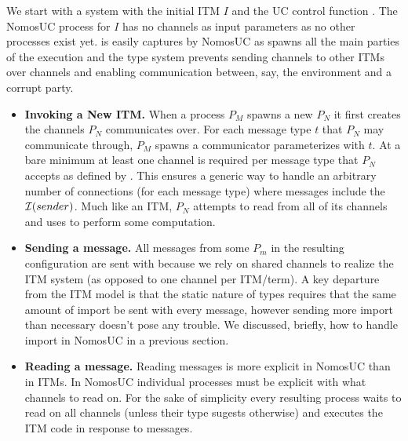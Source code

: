 We start with a system with the initial ITM $I$ and the UC control function \cf.
The NomosUC process for $I$ has no channels as input parameters as no other processes exist yet.
\cf is easily captures by NomosUC as  spawns all the main parties of the execution and the type system prevents sending channels to other ITMs over channels and enabling communication between, say, the environment and a corrupt party.

\begin{itemize}
	\item {\bf Invoking a New ITM.} 
		When a process $P_M$ spawns a new $P_N$ it first creates the channels $P_N$ communicates over. 
		For each message type $t$ that $P_N$ may communicate through, $P_M$ spawns a communicator parameterizes with $t$.
		At a bare minimum at least one channel is required per message type that $P_N$ accepts as defined by \cf. 
		This ensures a generic way to handle an arbitrary number of connections (for each message type) where messages include the $\mathcal{I}(sender)$.
		Much like an ITM, $P_N$ attempts to read from all of its channels and uses  to perform some computation.
	\item {\bf Sending a message.} 
		All messages from some $P_m$ in the resulting configuration are sent with  because we rely on shared channels to realize the ITM system (as opposed to one channel per ITM/term). 
		A key departure from the ITM model is that the static nature of types requires that the same amount of import be sent with every message, however sending more import than necessary doesn't pose any trouble. We discussed, briefly, how to handle import in NomosUC in a previous section.   
	\item {\bf Reading a message.} 
		Reading messages is more explicit in NomosUC than in ITMs. 
		In NomosUC individual processes must be explicit with  what channels to read on. 
		For the sake of simplicity every resulting process waits to read on all channels (unless their type sugests otherwise) and executes the ITM code in response to messages.
\end{itemize}



